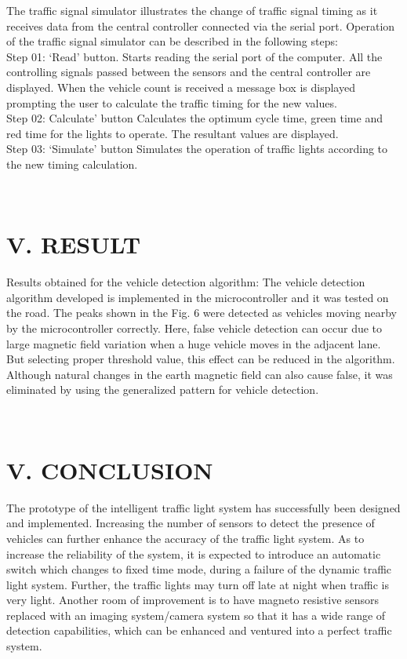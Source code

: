 \documentclass{SureshLimkar}
\begin{document}
The traffic signal simulator illustrates the change of traffic signal timing as it receives data from the central controller connected via the serial port.  Operation of the traffic signal simulator can be described in the following steps:\\ 
\hspace Step 01: ‘Read’ button. Starts reading the serial port of the computer. All the controlling signals passed between the sensors and the central controller are displayed. When the vehicle count is received a message box is displayed prompting the user to calculate the traffic timing for the new values.\\
\hspace Step 02: Calculate’ button Calculates the optimum cycle time, green time and red time for the lights to operate. The resultant values are displayed.\\
\hspace Step 03: ‘Simulate’ button Simulates the operation of traffic lights according to the new timing calculation.
\begin{figure}[h]%
\centering
{}%
\label{Emulator}%
\end{figure}
\\
\chapter{V. RESULT}
\hspace{0.5 in}Results obtained for the vehicle detection algorithm: The vehicle detection algorithm developed is implemented in the microcontroller and it was tested on the road.  The peaks shown in the Fig.  6 were detected as vehicles moving nearby by the microcontroller correctly. Here, false vehicle detection can occur due to large magnetic field variation when a huge vehicle moves in the adjacent lane. But selecting proper threshold value, this effect can be reduced in the algorithm.
Although natural changes in the earth magnetic field can also cause false, it was eliminated by using the generalized pattern for vehicle detection.

\begin{figure}[h]%
\centering
{}%
\label{Result Graph}%
\end{figure}
\\

\chapter{V. CONCLUSION}
\hspace{0.5 in}The prototype of the intelligent traffic light system has 
successfully been designed and implemented. 
Increasing the number of sensors to detect the presence of 
vehicles can further enhance the accuracy of the traffic light 
system. As to increase the reliability of the system, it is 
expected to introduce an automatic switch which changes to 
fixed time mode, during a failure of the dynamic traffic light 
system. Further, the traffic lights may turn off late at night 
when traffic is very light. 
 Another room of improvement is to have magneto resistive 
sensors replaced with an imaging system/camera system so 
that it has a wide range of detection capabilities, which can be 
enhanced and ventured into a perfect traffic system.
\end{document}
